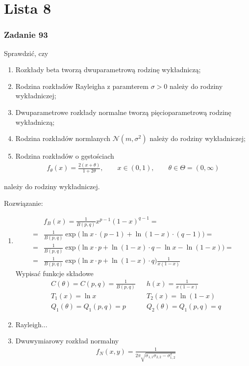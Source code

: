 \chapter*{Lista 8}


\subsection*{Zadanie 93}
Sprawdzić, czy
\begin{enumerate}
\item Rozkłady beta tworzą dwuparametrową rodzinę wykładniczą;
\item Rodzina rozkładów Rayleigha z paramterem $ \sigma>0 $ należy do rodziny wykładniczej;
\item Dwuparametrowe rozkłady normalne tworzą pięcioparametrową rodzinę wykładniczą;
\item Rodzina rozkładów normlanych $ \mathcal N(m,\sigma^2) $ należy do rodziny wykładniczej;
\item Rodzina rozkładów o gęstościach
\begin{gather*}
f_\theta (x)=\frac{2(x+\theta)}{1+2\theta},\qquad
x\in(0,1),\qquad\theta \in \Theta=(0,\infty )
\end{gather*}
\end{enumerate}
należy do rodziny wykładniczej.

Rozwiązanie:
\begin{enumerate}
\item 
\begin{align*}
&f_B(x)=\frac{1}{B (p,q)}x^{p-1}(1-x)^{q-1}
=\\=&
\frac{1}{B (p,q)}\exp\bigl(\ln x\cdot (p-1)+\ln (1-x)\cdot (q-1)\bigr)
=\\=&
\frac{1}{B (p,q)}\exp\bigl(\ln x\cdot p+\ln (1-x)\cdot q-\ln x-\ln (1-x)\bigr)
=\\=&
\frac{1}{B (p,q)}\exp\bigl(\ln x\cdot p+\ln (1-x)\cdot q\bigr)\frac{1}{x(1-x)}
\end{align*}
Wypisać funkcje składowe
\begin{align*}
&C(\theta)=C(p,q)=\frac{1}{B(p,q)}
&&
h(x)=\frac{1}{x(1-x)}\\
&T_1(x)=\ln x
&&
T_2(x)=\ln(1-x)\\
&Q_1(\theta)=Q_1(p,q)=p
&&
Q_2(\theta)=Q_1(p,q)=q
\end{align*}
\item Rayleigh...
\item Dwuwymiarowy rozkład normalny
\begin{align*}
&f_N(x,y)=
\frac{1}{2 \pi  \sqrt{\sigma _{1,1} \sigma_{2,2}-\sigma_{1,2}^2}}
\end{align*}
\end{enumerate}